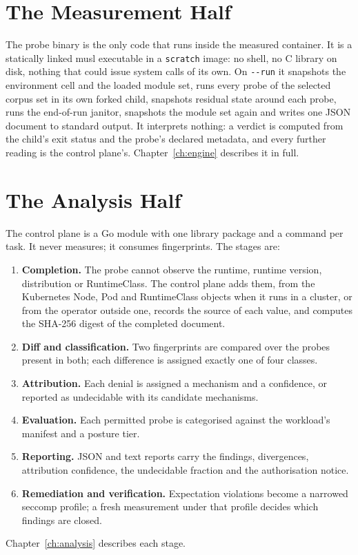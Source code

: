\section{The Measurement Half}

The probe binary is the only code that runs inside the measured container. It is a statically linked musl executable in a \texttt{scratch} image: no shell, no C library on disk, nothing that could issue system calls of its own. On \texttt{-{}-run} it snapshots the environment cell and the loaded module set, runs every probe of the selected corpus set in its own forked child, snapshots residual state around each probe, runs the end-of-run janitor, snapshots the module set again and writes one JSON document to standard output. It interprets nothing: a verdict is computed from the child's exit status and the probe's declared metadata, and every further reading is the control plane's. Chapter~\ref{ch:engine} describes it in full.

\section{The Analysis Half}

The control plane is a Go module with one library package and a command per task. It never measures; it consumes fingerprints. The stages are:
\begin{enumerate}[leftmargin=*]
\item \textbf{Completion.} The probe cannot observe the runtime, runtime version, distribution or RuntimeClass. The control plane adds them, from the Kubernetes Node, Pod and RuntimeClass objects when it runs in a cluster, or from the operator outside one, records the source of each value, and computes the SHA-256 digest of the completed document.
\item \textbf{Diff and classification.} Two fingerprints are compared over the probes present in both; each difference is assigned exactly one of four classes.
\item \textbf{Attribution.} Each denial is assigned a mechanism and a confidence, or reported as undecidable with its candidate mechanisms.
\item \textbf{Evaluation.} Each permitted probe is categorised against the workload's manifest and a posture tier.
\item \textbf{Reporting.} JSON and text reports carry the findings, divergences, attribution confidence, the undecidable fraction and the authorisation notice.
\item \textbf{Remediation and verification.} Expectation violations become a narrowed seccomp profile; a fresh measurement under that profile decides which findings are closed.
\end{enumerate}
Chapter~\ref{ch:analysis} describes each stage.


